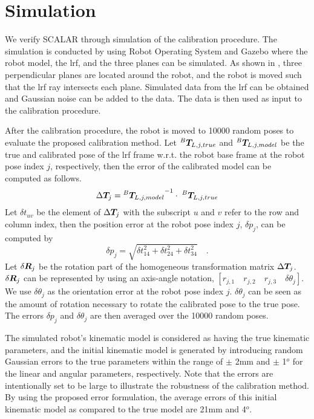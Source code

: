 \section{Simulation}
\label{sec:simulation}

We verify SCALAR through simulation of the calibration procedure. The simulation is conducted by using Robot Operating System and Gazebo where the robot model, the \ac{lrf}, and the three planes can be simulated.  
As shown in , three perpendicular planes are located around the robot, and the robot is moved such that the \ac{lrf} ray intersects each plane. Simulated data from the \ac{lrf} can be obtained and Gaussian noise can be added to the data. The data is then used as input to the calibration procedure. 

After the calibration procedure, the robot is moved to 10000 random poses to evaluate the proposed calibration method. Let ${^B}\vb*{T}_{L,j,true}$ and ${^B}\vb*{T}_{L,j,model}$ be the true and calibrated pose of the \ac{lrf} frame w.r.t. the robot base frame at the robot pose index $j$, respectively, then the error of the calibrated model can be computed as follows. 
\begin{equation}
\Delta \vb*{T}_j =  {{^B}\vb*{T}_{L,j,model}}^{-1} \cdot\; {^B}\vb*{T}_{L,j,true}
\end{equation}
Let $\delta t_{uv}$ be the element of $\Delta \vb*{T}_j$ with the subscript $u$ and $v$ refer to the row and column index, then the position error at the robot pose index $j$, $\delta p_j$, can be computed by
\begin{equation}
\delta p_j = \sqrt{\delta t_{14}^2 + \delta t_{24}^2 + \delta t_{34}^2} \quad .
\end{equation}
Let $\delta \vb*{R}_j$ be the rotation part of the homogeneous transformation matrix $\Delta \vb*{T}_j$. $\delta \vb*{R}_j$ can be represented by using an axis-angle notation, $[r_{j,1}\quad r_{j,2}\quad r_{j,3}\quad \delta \theta_j]$. We use $\delta\theta_j$ as the orientation error at the robot pose index $j$.  $\delta\theta_j$ can be seen as the amount of rotation necessary to rotate the calibrated pose to the true pose. The errors $\delta p_j$ and $\delta\theta_j$ are then averaged over the 10000 random poses.

The simulated robot's kinematic model is considered as having the true kinematic parameters, and the initial kinematic model is generated by introducing random Gaussian errors to the true parameters within the range of $\pm$ 2mm and $\pm$ 1$^o$ for the linear and angular parameters, respectively. Note that the errors are intentionally set to be large to illustrate the robustness of the calibration method. By using the proposed error formulation, the average errors of this initial kinematic model as compared to the true model are 21mm and 4$^o$.


